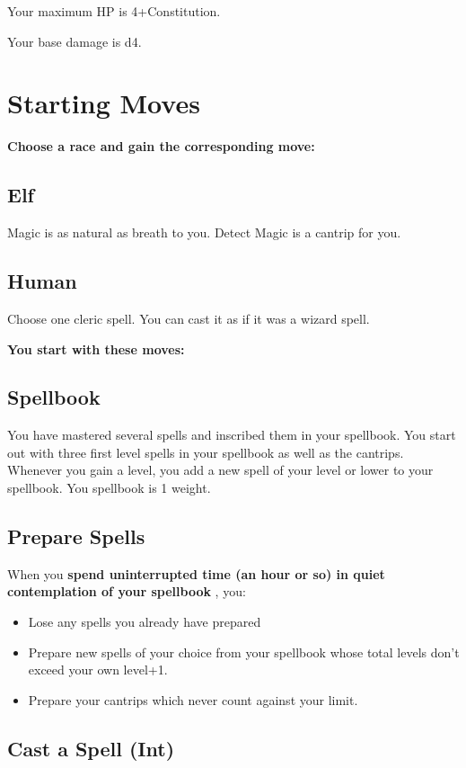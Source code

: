 Your maximum HP is 4+Constitution.

Your base damage is d4.
\section*{Starting Moves}

{\bfseries Choose a race and gain the corresponding move:}
\subsection{Elf}

Magic is as natural as breath to you. Detect Magic is a cantrip for you.
\subsection{Human}

Choose one cleric spell. You can cast it as if it was a wizard spell.

\vspace{\baselineskip}
{\bfseries You start with these moves:}
\subsection{Spellbook}

You have mastered several spells and inscribed them in your spellbook. You start out with three first level spells in your spellbook as well as the cantrips. Whenever you gain a level, you add a new spell of your level or lower to your spellbook. You spellbook is 1 weight.
\subsection{Prepare Spells}

When you \textbf{spend uninterrupted time (an hour or so) in quiet contemplation of your spellbook}
, you:
\begin{itemize}
\item Lose any spells you already have prepared
\item Prepare new spells of your choice from your spellbook whose total levels don't exceed your own level+1.
\item Prepare your cantrips which never count against your limit.

\end{itemize}
\subsection{Cast a Spell (Int)}


